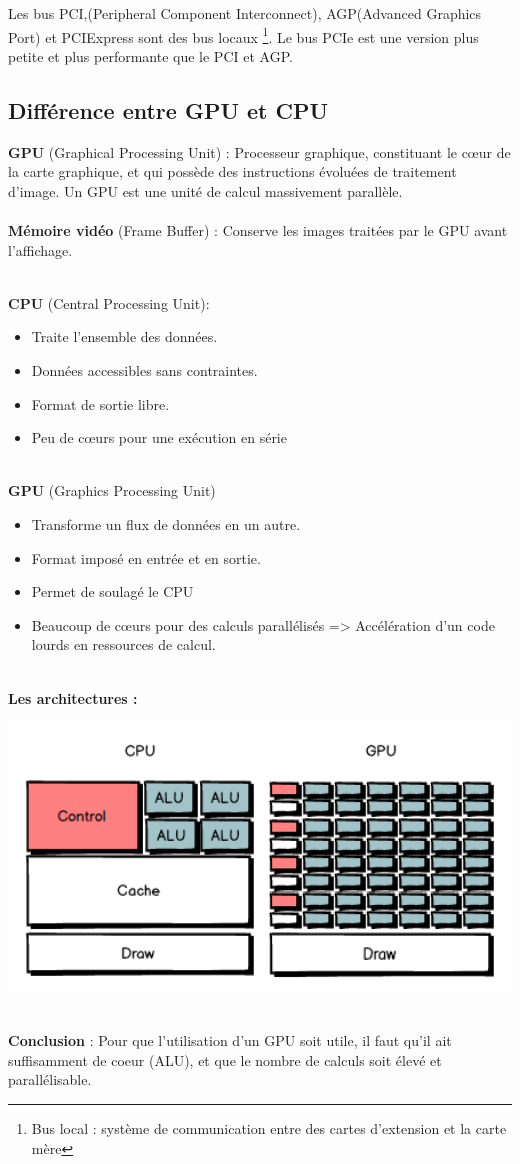 Les bus PCI,(Peripheral Component Interconnect), AGP(Advanced Graphics Port) et PCIExpress sont des bus locaux
\footnote{ Bus local : système de communication entre des cartes d’extension et la carte mère}.
Le bus PCIe est une version plus petite et plus performante que le PCI et AGP.

\subsection{Différence entre GPU et CPU}
\textbf{GPU} (Graphical Processing Unit) : Processeur graphique, constituant le cœur de la carte graphique, et qui possède des instructions évoluées de traitement d’image. Un GPU est une unité de calcul massivement parallèle.\\\\
\textbf{Mémoire vidéo} (Frame Buffer) : Conserve les images traitées par le GPU avant l’affichage.

\textbf{\\CPU} (Central Processing Unit):
\begin{itemize}
	\item	Traite l'ensemble des données.
	\item	Données accessibles sans contraintes.
	\item	Format de sortie libre.
	\item	Peu de cœurs pour une exécution  en série
\end{itemize}

\textbf{\\GPU} (Graphics Processing Unit)
\begin{itemize}
	\item	Transforme un flux de données en un autre.
	\item	Format imposé en entrée et en sortie.
	\item	Permet de soulagé le CPU
	\item	Beaucoup de cœurs pour des calculs parallélisés => Accélération d’un code lourds en ressources de calcul.
\end{itemize}

\textbf{\\Les architectures :}
\\
\begin{center}
\includegraphics[width=14cm]{pipeline/images/GPUCPU.png}
\end{center}

\textbf{\\Conclusion} : Pour que l’utilisation d’un GPU soit utile, il faut qu'il ait suffisamment de coeur (ALU), et que le nombre de calculs soit élevé et parallélisable.


